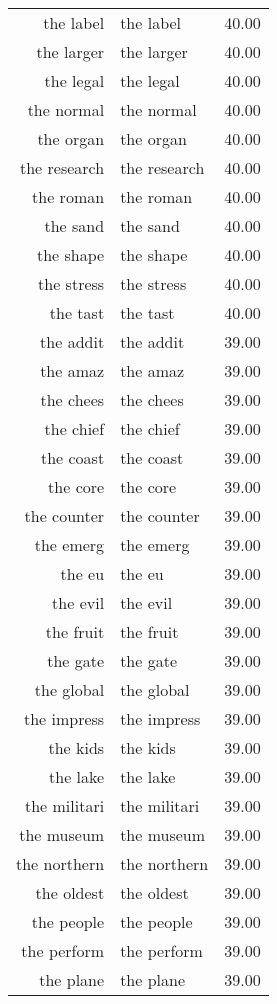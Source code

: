 \begin{table}[ht]
\begin{tabular}{rlr}
  the label & the label & 40.00 \\ 
  the larger & the larger & 40.00 \\ 
  the legal & the legal & 40.00 \\ 
  the normal & the normal & 40.00 \\ 
  the organ & the organ & 40.00 \\ 
  the research & the research & 40.00 \\ 
  the roman & the roman & 40.00 \\ 
  the sand & the sand & 40.00 \\ 
  the shape & the shape & 40.00 \\ 
  the stress & the stress & 40.00 \\ 
  the tast & the tast & 40.00 \\ 
  the addit & the addit & 39.00 \\ 
  the amaz & the amaz & 39.00 \\ 
  the chees & the chees & 39.00 \\ 
  the chief & the chief & 39.00 \\ 
  the coast & the coast & 39.00 \\ 
  the core & the core & 39.00 \\ 
  the counter & the counter & 39.00 \\ 
  the emerg & the emerg & 39.00 \\ 
  the eu & the eu & 39.00 \\ 
  the evil & the evil & 39.00 \\ 
  the fruit & the fruit & 39.00 \\ 
  the gate & the gate & 39.00 \\ 
  the global & the global & 39.00 \\ 
  the impress & the impress & 39.00 \\ 
  the kids & the kids & 39.00 \\ 
  the lake & the lake & 39.00 \\ 
  the militari & the militari & 39.00 \\ 
  the museum & the museum & 39.00 \\ 
  the northern & the northern & 39.00 \\ 
  the oldest & the oldest & 39.00 \\ 
  the people & the people & 39.00 \\ 
  the perform & the perform & 39.00 \\ 
  the plane & the plane & 39.00 \\ 

\end{tabular}
\end{table}
